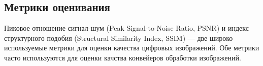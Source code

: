 \subsection{Метрики оценивания}\label{sect-1-3}

Пиковое отношение сигнал-шум (Peak Signal-to-Noise Ratio, PSNR) и индекс структурного подобия (Structural Similarity Index, SSIM) — две широко используемые метрики для оценки качества цифровых изображений. Обе метрики часто используются для оценки качства конвейеров обработки изображений.

